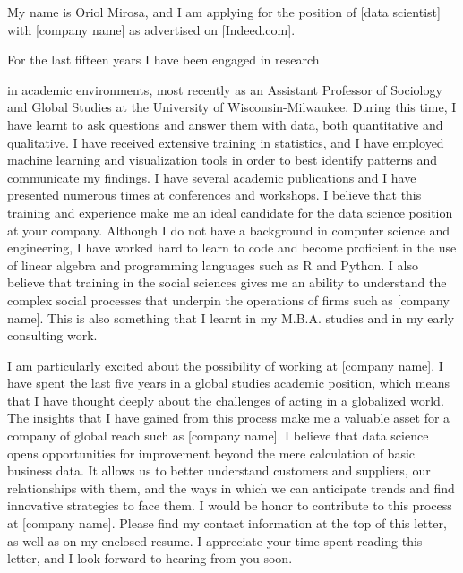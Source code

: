 \cvletter{}

\cvparagraph{}
  {My name is Oriol Mirosa, and I am applying for the position of [data scientist] with [company name] as advertised on [Indeed.com].}
\cvparagraph{}
  {For the last fifteen years I have been engaged in research 

   in academic environments, most recently as an Assistant Professor of Sociology and Global Studies at the University of Wisconsin-Milwaukee. During this time, I have learnt to ask questions and answer them with data, both quantitative and qualitative. I have received extensive training in statistics, and I have employed machine learning and visualization tools in order to best identify patterns and communicate my findings. I have several academic publications and I have presented numerous times at conferences and workshops. I believe that this training and experience make me an ideal candidate for the data science position at your company. Although I do not have a background in computer science and engineering, I have worked hard to learn to code and become proficient in the use of linear algebra and programming languages such as R and Python. I also believe that training in the social sciences gives me an ability to understand the complex social processes that underpin the operations of firms such as [company name]. This is also something that I learnt in my M.B.A. studies and in my early consulting work.}
\cvparagraph{}
  {I am particularly excited about the possibility of working at [company name]. I have spent the last five years in a global studies academic position, which means that I have thought deeply about the challenges of acting in a globalized world. The insights that I have gained from this process make me a valuable asset for a company of global reach such as [company name]. I believe that data science opens opportunities for improvement beyond the mere calculation of basic business data. It allows us to better understand customers and suppliers, our relationships with them, and the ways in which we can anticipate trends and find innovative strategies to face them. I would be honor to contribute to this process at [company name].}
\cvparagraph{}
  {Please find my contact information at the top of this letter, as well as on my enclosed resume. I appreciate your time spent reading this letter, and I look forward to hearing from you soon.}
